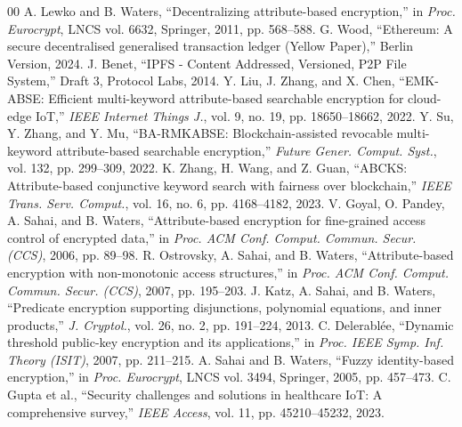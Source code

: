 \documentclass[journal,10pt,twocolumn]{IEEEtran}
\begin{document}
\begin{thebibliography}{00}
 A. Lewko and B. Waters, ``Decentralizing attribute-based encryption,'' in \textit{Proc. Eurocrypt}, LNCS vol. 6632, Springer, 2011, pp. 568–588.
 G. Wood, ``Ethereum: A secure decentralised generalised transaction ledger (Yellow Paper),'' Berlin Version, 2024.
 J. Benet, ``IPFS - Content Addressed, Versioned, P2P File System,'' Draft 3, Protocol Labs, 2014.
 Y. Liu, J. Zhang, and X. Chen, ``EMK-ABSE: Efficient multi-keyword attribute-based searchable encryption for cloud-edge IoT,'' \textit{IEEE Internet Things J.}, vol. 9, no. 19, pp. 18650–18662, 2022.
 Y. Su, Y. Zhang, and Y. Mu, ``BA-RMKABSE: Blockchain-assisted revocable multi-keyword attribute-based searchable encryption,'' \textit{Future Gener. Comput. Syst.}, vol. 132, pp. 299–309, 2022.
 K. Zhang, H. Wang, and Z. Guan, ``ABCKS: Attribute-based conjunctive keyword search with fairness over blockchain,'' \textit{IEEE Trans. Serv. Comput.}, vol. 16, no. 6, pp. 4168–4182, 2023.
 V. Goyal, O. Pandey, A. Sahai, and B. Waters, ``Attribute-based encryption for fine-grained access control of encrypted data,'' in \textit{Proc. ACM Conf. Comput. Commun. Secur. (CCS)}, 2006, pp. 89–98.
 R. Ostrovsky, A. Sahai, and B. Waters, ``Attribute-based encryption with non-monotonic access structures,'' in \textit{Proc. ACM Conf. Comput. Commun. Secur. (CCS)}, 2007, pp. 195–203.
 J. Katz, A. Sahai, and B. Waters, ``Predicate encryption supporting disjunctions, polynomial equations, and inner products,'' \textit{J. Cryptol.}, vol. 26, no. 2, pp. 191–224, 2013.
 C. Delerablée, ``Dynamic threshold public-key encryption and its applications,'' in \textit{Proc. IEEE Symp. Inf. Theory (ISIT)}, 2007, pp. 211–215.
 A. Sahai and B. Waters, ``Fuzzy identity-based encryption,'' in \textit{Proc. Eurocrypt}, LNCS vol. 3494, Springer, 2005, pp. 457–473.
 C. Gupta et al., ``Security challenges and solutions in healthcare IoT: A comprehensive survey,'' \textit{IEEE Access}, vol. 11, pp. 45210–45232, 2023.
\end{thebibliography}
\end{document}
